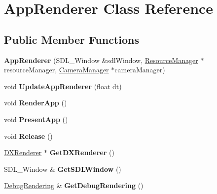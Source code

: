 \hypertarget{classAppRenderer}{}\section{App\+Renderer Class Reference}
\label{classAppRenderer}
\subsection*{Public Member Functions}
\begin{DoxyCompactItemize}
\item 
\mbox{\label{classAppRenderer_a01b9e6fe7b454466ea00c81d0eb8a89c}} 
{\bfseries App\+Renderer} (S\+D\+L\+\_\+\+Window \&sdl\+Window, \hyperlink{classResourceManager}{Resource\+Manager} $\ast$resource\+Manager, \hyperlink{classCameraManager}{Camera\+Manager} $\ast$camera\+Manager)
\item 
\mbox{\label{classAppRenderer_afef47670f4584e2caa6fa750aacd089e}} 
void {\bfseries Update\+App\+Renderer} (float dt)
\item 
\mbox{\label{classAppRenderer_a2a094187727c735aeb1ca376f4d02f29}} 
void {\bfseries Render\+App} ()
\item 
\mbox{\label{classAppRenderer_a393b3c6f865bc07612f26e185100ca6a}} 
void {\bfseries Present\+App} ()
\item 
\mbox{\label{classAppRenderer_ab0d289c6d6375e274c91f42d3256d584}} 
void {\bfseries Release} ()
\item 
\mbox{\label{classAppRenderer_a22dc8c3e1972281376b321336d6451a3}} 
\hyperlink{classDXRenderer}{D\+X\+Renderer} $\ast$ {\bfseries Get\+D\+X\+Renderer} ()
\item 
\mbox{\label{classAppRenderer_ae523d428966c527b385a65bae7bdb086}} 
S\+D\+L\+\_\+\+Window \& {\bfseries Get\+S\+D\+L\+Window} ()
\item 
\mbox{\label{classAppRenderer_af4f38db33ff5ff4a321e9c44e9472b41}} 
\hyperlink{classDebugRendering}{Debug\+Rendering} \& {\bfseries Get\+Debug\+Rendering} ()
\item 

\end{DoxyCompactItemize}
